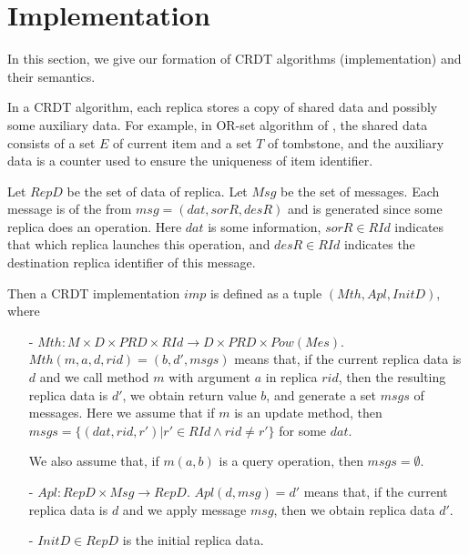 
\section{Implementation}
\label{sec:implementation}

In this section, we give our formation of CRDT algorithms (implementation) and their semantics.

In a CRDT algorithm, each replica stores a copy of shared data and possibly some auxiliary data. For example, in OR-set algorithm of \cite{Bieniusa:2012}, the shared data consists of a set $E$ of current item and a set $T$ of tombstone, and the auxiliary data is a counter used to ensure the uniqueness of item identifier.

Let $RepD$ be the set of data of replica. Let $Msg$ be the set of messages. Each message is of the from $msg=(dat,sorR,desR)$ and is generated since some replica does an operation. Here $dat$ is some information, %
$sorR \in RId$ indicates that which replica launches this operation, and $desR \in RId$ indicates the destination replica identifier of this message. %

Then a CRDT implementation $imp$ is defined as a tuple $(Mth,Apl,InitD)$, where

\begin{itemize}
\setlength{\itemsep}{0.5pt}
\item[-] $Mth: M \times D \times PRD \times RId \rightarrow D \times PRD \times Pow(Mes)$. $Mth(m,a,d,rid) = (b,d',msgs)$ means that, if the current replica data is $d$ and we call method $m$ with argument $a$ in replica $rid$, then the resulting replica data is $d'$, we obtain return value $b$, and generate a set $msgs$ of messages. Here we assume that if $m$ is an update method, then $msgs = \{ (dat,rid,r') \vert r' \in RId \wedge rid \neq r' \}$ for some $dat$. %

    We also assume that, if $m(a,b)$ is a query operation, then $msgs = \emptyset$.

\item[-] $Apl: RepD \times Msg \rightarrow RepD$. $Apl(d,msg) = d'$ means that, if the current replica data is $d$ and we apply message $msg$, then we obtain replica data $d'$.

\item[-] $InitD \in RepD$ is the initial replica data.
\end{itemize}

